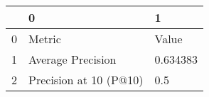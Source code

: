 \begin{tabular}{lll}
\toprule
{} &                       0 &         1 \\
\midrule
0 &                  Metric &     Value \\
1 &       Average Precision &  0.634383 \\
2 &  Precision at 10 (P@10) &       0.5 \\
\bottomrule
\end{tabular}
